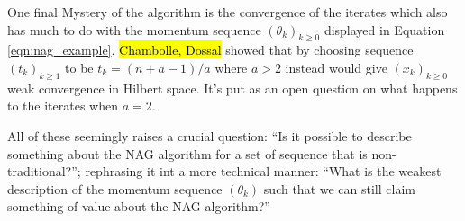 \documentclass[12pt]{article}
\begin{document}
    \par
    One final Mystery of the algorithm is the convergence of the iterates which also has much to do with the momentum sequence $(\theta_k)_{k\ge 0}$ displayed in Equation \ref{eqn:nag_example}. 
    {\hl{Chambolle, Dossal}} \cite{chambolle_convergence_2015}
    showed that by choosing sequence $(t_k)_{k \ge 1}$ to be $t_k = (n + a - 1)/a$ where $a > 2$ instead would give $(x_k)_{k \ge 0}$ weak convergence in Hilbert space. 
    It's put as an open question on what happens to the iterates when $a = 2$. 
    \par
    All of these seemingly raises a crucial question: ``Is it possible to describe something about the NAG algorithm for a set of sequence that is non-traditional?''; rephrasing it int a more technical manner: ``What is the weakest description of the momentum sequence $(\theta_k)$ such that we can still claim something of value about the NAG algorithm?''
\end{document}
